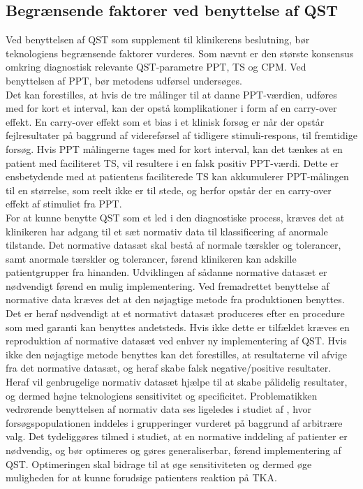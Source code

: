 \subsection{Begrænsende faktorer ved benyttelse af QST}
Ved benyttelsen af QST som supplement til klinikerens beslutning, bør teknologiens begrænsende faktorer vurderes. Som nævnt er den største konsensus omkring diagnostisk relevante QST-parametre PPT, TS og CPM. Ved benyttelsen af PPT, bør metodens udførsel undersøges. \\
Det kan forestilles, at hvis de tre målinger til at danne PPT-værdien, udføres med for kort et interval, kan der opstå komplikationer i form af en carry-over effekt. En carry-over effekt som et bias i et klinisk forsøg er når der opstår fejlresultater på baggrund af videreførsel af tidligere stimuli-respons, til fremtidige forsøg. Hvis PPT målingerne tages med for kort interval, kan det tænkes at en patient med faciliteret TS, vil resultere i en falsk positiv PPT-værdi. Dette er ensbetydende med at patientens faciliterede TS kan akkumulerer PPT-målingen til en størrelse, som reelt ikke er til stede, og herfor opstår der en carry-over effekt af stimuliet fra PPT. \citep{Porta2008}  \\
For at kunne benytte QST som et led i den diagnostiske process, kræves det at klinikeren har adgang til et sæt normativ data til klassificering af anormale tilstande. Det normative datasæt skal bestå af normale tærskler og tolerancer, samt anormale tærskler og tolerancer, førend klinikeren kan adskille patientgrupper fra hinanden. Udviklingen af sådanne normative datasæt er nødvendigt førend en mulig implementering. Ved fremadrettet benyttelse af normative data kræves det at den nøjagtige metode fra produktionen benyttes. Det er heraf nødvendigt at et normativt datasæt produceres efter en procedure som med garanti kan benyttes andetsteds. Hvis ikke dette er tilfældet kræves en reproduktion af normative datasæt ved enhver ny implementering af QST. Hvis ikke den nøjagtige metode benyttes kan det forestilles, at resultaterne vil afvige fra det normative datasæt, og heraf skabe falsk negative/positive resultater. Heraf vil genbrugelige normativ datasæt  hjælpe til at skabe pålidelig resultater, og dermed højne teknologiens sensitivitet og specificitet.  \citep{Yarnitsky1997} Problematikken vedrørende benyttelsen af normativ data ses ligeledes i studiet af , hvor forsøgspopulationen inddeles i grupperinger vurderet på baggrund af arbitrære valg. Det tydeliggøres tilmed i studiet, at en normative inddeling af patienter er nødvendig, og bør optimeres og gøres generaliserbar, førend implementering af QST. Optimeringen skal bidrage til at øge sensitiviteten og dermed øge muligheden for at kunne forudsige patienters reaktion på TKA. \\

